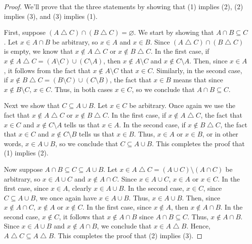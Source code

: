 \documentclass[12pt]{amsart}
\theoremstyle{definition}
\theoremstyle{remark}
\begin{document}
\begin{proof}
We'll prove that the three statements by showing that (1) implies (2), (2) implies (3), and (3) implies (1).

First, suppose $(A \bigtriangleup C) \cap (B \bigtriangleup C) = \varnothing$.
We start by showing that $A \cap B \subseteq C$.
Let $x \in A \cap B$ be arbitrary, so $x \in A$ and $x \in B$.
Since $(A \bigtriangleup C) \cap (B \bigtriangleup C)$ is empty, we know that $x \notin A \bigtriangleup C$ or $x \notin B \bigtriangleup C$.
In the first case, if $x \notin A \bigtriangleup C = (A \setminus C) \cup (C \setminus A)$, then $x \notin A \setminus C$ and $x \notin C \setminus A$.
Then, since $x \in A$, it follows from the fact that $x \notin A \setminus C$ that $x \in C$.
Similarly, in the second case, if $x \notin B \bigtriangleup C = (B \setminus C) \cup (C \setminus B)$, the fact that $x \in B$ means that since $x \notin B \setminus C$, $x \in C$.
Thus, in both cases $x \in C$, so we conclude that $A \cap B \subseteq C$.

Next we show that $C \subseteq A \cup B$.
Let $x \in C$ be arbitrary.
Once again we use the fact that $x \notin A \bigtriangleup C$ or $x \notin B \bigtriangleup C$.
In the first case, if $x \notin A \bigtriangleup C$, the fact that $x \in C$ and $x \notin C \setminus A$ tells us that $x \in A$.
In the second case, if $x \notin B \bigtriangleup C$, the fact that $x \in C$ and $x \notin C \setminus B$ tells us that $x \in B$.
Thus, $x \in A$ or $x \in B$, or in other words, $x \in A \cup B$, so we conclude that $C \subseteq A \cup B$.
This completes the proof that (1) implies (2).

Now suppose $A \cap B \subseteq C \subseteq A \cup B$.
Let $x \in A \bigtriangleup C = (A \cup C) \setminus (A \cap C)$ be arbitrary, so $x \in A \cup C$ and $x \notin A \cap C$.
Since $x \in A \cup C$, $x \in A$ or $x \in C$.
In the first case, since $x \in A$, clearly $x \in A \cup B$.
In the second case, $x \in C$, since $C \subseteq A \cup B$, we once again have $x \in A \cup B$.
Thus, $x \in A \cup B$.
Then, since $x \notin A \cap C$, $x \notin A$ or $x \notin C$.
In the first case, since $x \notin A$, then $x \notin A \cap B$.
In the second case, $x \notin C$, it follows that $x \notin A \cap B$ since $A \cap B \subseteq C$.
Thus, $x \notin A \cap B$.
Since $x \in A \cup B$ and $x \notin A \cap B$, we conclude that $x \in A \bigtriangleup B$.
Hence, $A \bigtriangleup C \subseteq A \bigtriangleup B$.
This completes the proof that (2) implies (3).


\end{proof}
\end{document}
